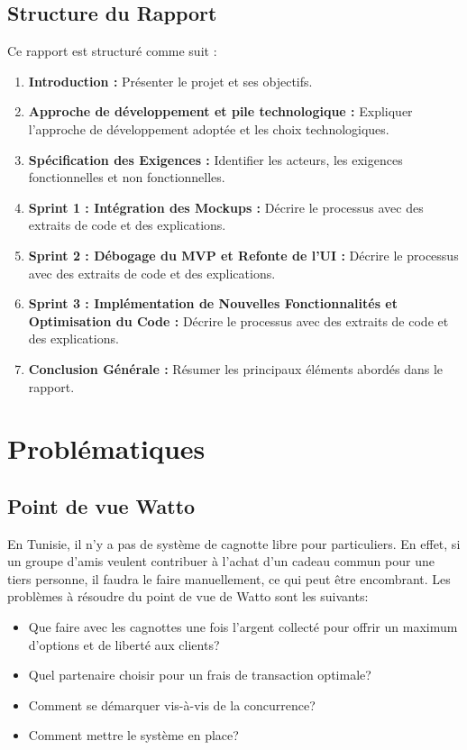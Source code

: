 \documentclass[../main.tex]{subfiles}
\begin{document}
\subsection{Structure du Rapport}
Ce rapport est structuré comme suit :

\begin{enumerate}
  \item \textbf{Introduction :} Présenter le projet et ses objectifs.
  \item \textbf{Approche de développement et pile technologique :} Expliquer l'approche de développement adoptée et les choix technologiques.
  \item \textbf{Spécification des Exigences :} Identifier les acteurs, les exigences fonctionnelles et non fonctionnelles.
  \item \textbf{Sprint 1 : Intégration des Mockups :} Décrire le processus avec des extraits de code et des explications.
  \item \textbf{Sprint 2 : Débogage du MVP et Refonte de l'UI :} Décrire le processus avec des extraits de code et des explications.
  \item \textbf{Sprint 3 : Implémentation de Nouvelles Fonctionnalités et Optimisation du Code :} Décrire le processus avec des extraits de code et des explications.
  \item \textbf{Conclusion Générale :} Résumer les principaux éléments abordés dans le rapport.
\end{enumerate}
\newpage

\section{Problématiques}
 \subsection{Point de vue Watto}
  En Tunisie, il n'y a pas de système de cagnotte libre pour particuliers. En effet, si un groupe d'amis veulent contribuer à l'achat d'un cadeau commun pour une tiers personne, il faudra le faire manuellement, ce qui peut être encombrant. 
  Les problèmes à résoudre du point de vue de Watto sont les suivants: 
 \begin{itemize}
  \item Que faire avec les cagnottes une fois l'argent collecté pour offrir un maximum d'options et de liberté aux clients?
  \item Quel partenaire choisir pour un frais de transaction optimale?
  \item Comment se démarquer vis-à-vis de la concurrence?
  \item Comment mettre le système en place?
\end{itemize} 
\end{document}
